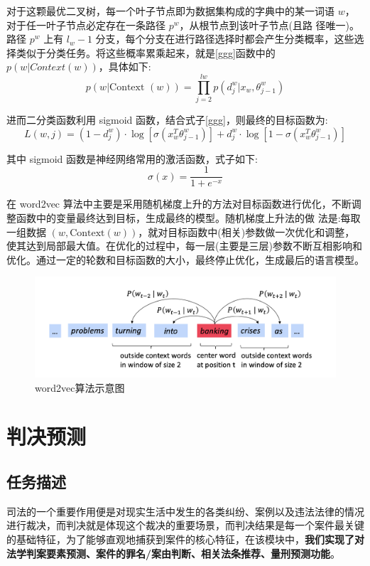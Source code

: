 对于这颗最优二叉树，每一个叶子节点即为数据集构成的字典中的某一词语 $w$，对于任一叶子节点必定存在一条路径 $p^w$，从根节点到该叶子节点(且路 径唯一)。路径 $p^w$ 上有 $l_{w} - 1$ 分支，每个分支在进行路径选择时都会产生分类概率，这些选择类似于分类任务。将这些概率累乘起来，就是\ref{ggg}函数中的 $p(w|Context(w))$，具体如下:
	\begin{equation}
		p(w | \text {Context }(w))=\prod_{j=2}^{l w} p\left(d_{j}^{w} | x_{w}, \theta_{j-1}^{w}\right)
	\end{equation}
	
进而二分类函数利用 sigmoid 函数，结合式子\ref{ggg}，则最终的目标函数为:
\begin{equation}
L(w, j)=\left(1-d_{j}^{w}\right) \cdot \log \left[\sigma\left(x_{w}^{T} \theta_{j-1}^{w}\right)\right]+d_{j}^{w} \cdot \log \left[1-\sigma\left(x_{w}^{T} \theta_{j-1}^{w}\right)\right]
\end{equation}

其中 sigmoid 函数是神经网络常用的激活函数，式子如下:
\begin{equation}
\sigma(x)=\frac{1}{1+e^{-x}}
\end{equation}

在 word2vec 算法中主要是采用随机梯度上升的方法对目标函数进行优化，不断调整函数中的变量最终达到目标，生成最终的模型。随机梯度上升法的做 法是:每取一组数据 $(w, \text{Context}(w))$，就对目标函数中(相关)参数做一次优化和调整，使其达到局部最大值。在优化的过程中，每一层(主要是三层)参数不断互相影响和优化。通过一定的轮数和目标函数的大小，最终停止优化，生成最后的语言模型。

\begin{figure}[ht]
    \centering
    \includegraphics[width=\linewidth]{figures/word2vec.png}
    \caption{word2vec算法示意图}
    \label{fig:word2vec_model}
\end{figure}


\section{判决预测}
\subsection{任务描述}
司法的一个重要作用便是对现实生活中发生的各类纠纷、案例以及违法法律的情况进行裁决，而判决就是体现这个裁决的重要场景，而判决结果是每一个案件最关键的基础特征，为了能够直观地捕获到案件的核心特征，在该模块中，\textbf{我们实现了对法学判案要素预测、案件的罪名/案由判断、相关法条推荐、量刑预测功能}。

